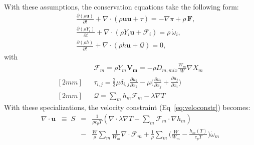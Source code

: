 With these assumptions, the conservation equations take the following form:
\begin{eqnarray}
&&\frac{\partial (\rho \boldsymbol{u})}{\partial t} + 
\nabla \cdot \left(\rho  \boldsymbol{u} \boldsymbol{u} + \tau \right)
= -\nabla \pi + \rho \, \boldsymbol{F}  ,
\nonumber
\\
&&\frac{\partial (\rho Y_i)}{\partial t} +
\nabla \cdot \left( \rho Y_i \boldsymbol{u} + \boldsymbol{\mathcal{F}}_{i} \right)
= \rho \, \dot{\omega}_i,
\label{eq:pelelm}
\\
&&\frac{ \partial (\rho h)}{ \partial t} +
\nabla \cdot \left( \rho h \boldsymbol{u} + \boldsymbol{\mathcal{Q}} \right) = 0 ,
\nonumber
\end{eqnarray}
with
 \begin{eqnarray*}
&&\boldsymbol{\mathcal{F}}_{m} = \rho Y_m \boldsymbol{V_m} = - \rho D_{m,mix} \frac{W_m}{W}  \nabla X_m
\\ [2mm]
&&\tau_{i,j} = \frac{2}{3} \mu \delta_{i,j} \frac{\partial {u_k}}{\partial x_k} - \mu \Big(\frac{\partial  u_i}{\partial x_j} + \frac{\partial  u_j}{\partial x_i}\Big)
\\ [2mm]
&&\boldsymbol{\mathcal{Q}} =  \sum_m h_m \boldsymbol{\mathcal{F}}_{m}  - \lambda \nabla T
\end{eqnarray*}
With these specializations, the velocity constraint (Eq~\ref{eq:veloconstr}) becomes:
\begin{eqnarray}
\nabla \cdot \boldsymbol{u} \;\;  \equiv \; S&=& \frac{1}{\rho c_{p} T}(\nabla \cdot \lambda \nabla T - \sum_m  \boldsymbol{\mathcal{F}}_{m} \cdot \nabla h_m) \nonumber
\\
&-& \frac{W}{\rho} \sum_m \frac{1}{W_m} \nabla \cdot \boldsymbol{\mathcal{F}}_{m} + \frac{1}{\rho} \sum_m \Big( \frac{W}{W_m} -\frac{h_m(T)}{c_{p} T} \Big)\dot{\omega}_m
\end{eqnarray}



